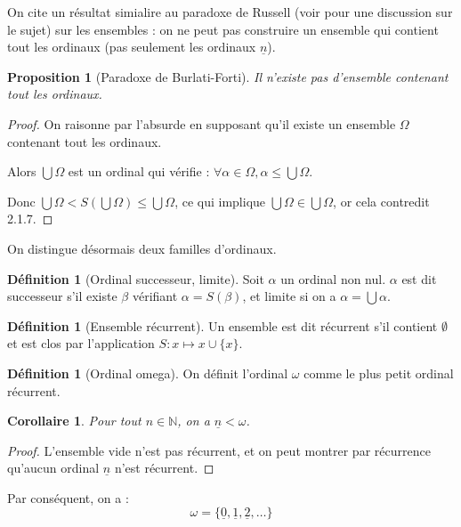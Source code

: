 \documentclass{article}
\theoremstyle{definition}
\newtheorem{definition}[subsubsection]{Définition}
\theoremstyle{plain}
\newtheorem{proposition}[subsubsection]{Proposition}
\theoremstyle{plain}
\newtheorem{corollary}[subsubsection]{Corollaire}
\theoremstyle{plain}
\theoremstyle{plain}
\theoremstyle{plain}
\begin{document}
\par On cite un résultat simialire au paradoxe de Russell (voir \cite{dumoncel2002philosophie} pour une discussion sur le sujet) sur les ensembles : on ne peut pas construire un ensemble qui contient tout les ordinaux (pas seulement les ordinaux \( \underline{n} \)).

\begin{proposition}[Paradoxe de Burlati-Forti]
	Il n'existe pas d'ensemble contenant tout les ordinaux.
\end{proposition}
\begin{proof}
	On raisonne par l'absurde en supposant qu'il existe un ensemble \( \Omega \) contenant tout les ordinaux.
	
	Alors \( \bigcup \Omega \) est un ordinal qui vérifie : \( \forall \alpha \in \Omega, \alpha \le \bigcup \Omega \). 

	Donc \( \bigcup\Omega < S(\bigcup\Omega) \le \bigcup\Omega \), ce qui implique \( \bigcup\Omega \in \bigcup\Omega \), or cela contredit 2.1.7.
\end{proof}
\par On distingue désormais deux familles d'ordinaux.
\begin{definition}[Ordinal successeur, limite]
	Soit \( \alpha \) un ordinal non nul. \( \alpha \) est dit successeur s'il existe \( \beta \) vérifiant \( \alpha = S(\beta) \), et limite si on a \( \alpha = \bigcup \alpha \).
\end{definition}

\begin{definition}[Ensemble récurrent]
	Un ensemble est dit récurrent s'il contient \( \emptyset \) et est clos par l'application \( S : x \mapsto x \cup \{x\} \).
\end{definition}
\begin{definition}[Ordinal omega]
	On définit l'ordinal \( \omega \) comme le plus petit ordinal récurrent.
\end{definition}

\begin{corollary}
	Pour tout \( n \in \mathbb{N} \), on a \( \underline{n} < \omega \).
\end{corollary}

\begin{proof}
	L'ensemble vide n'est pas récurrent, et on peut montrer par récurrence qu'aucun ordinal \( \underline{n} \) n'est récurrent.
\end{proof}

\par Par conséquent, on a :
\begin{equation*}
	\omega = \{\underline{0}, \underline{1}, \underline{2}, \ldots\}
\end{equation*}
\end{document}
